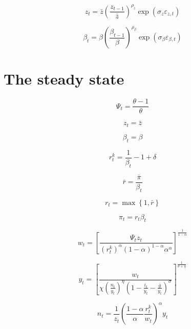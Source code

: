 \documentclass{article}
\begin{document}
\begin{equation}
z_{t}=\bar{z}\left( \frac{z_{t-1}}{\bar{z}}\right) ^{\rho _{z}}\exp \left(
\sigma _{z}\varepsilon _{z,t}\right)
\end{equation}

\begin{equation}
\beta _{t}=\beta \left( \frac{\beta _{t-1}}{\beta }\right) ^{\rho _{\beta
}}\exp \left( \sigma _{\beta }\varepsilon _{\beta ,t}\right)
\end{equation}

\section{The steady state}

\begin{equation}
\Psi _{t}=\frac{\theta -1}{\theta }
\end{equation}

\begin{equation}
z_{t}=\bar{z}
\end{equation}

\begin{equation}
\beta _{t}=\beta 
\end{equation}

\begin{equation}
r_{t}^{k}=\frac{1}{\beta _{t}}-1+\delta 
\end{equation}

\[
\bar{r}=\frac{\bar{\pi}}{\beta _{t}}
\]

\begin{equation}
r_{t}=\max \left\{ 1,\bar{r}\right\} 
\end{equation}

\begin{equation}
\pi _{t}=r_{t}\beta _{t}
\end{equation}

\begin{equation}
w_{t}=\left[ \frac{\Psi _{t}z_{t}}{\left( r_{t}^{k}\right) ^{\alpha }\left(
1-\alpha \right) ^{1-\alpha }\alpha ^{\alpha }}\right] ^{\frac{1}{1-\alpha }}
\end{equation}

\begin{equation}
y_{t}=\left[ \frac{w_{t}}{\chi \left( \frac{n_{t}}{y_{t}}\right) ^{\eta
}\left( 1-\frac{i_{t}}{y_{t}}-\frac{\bar{g}}{y_{t}}\right) ^{\sigma }}\right]
^{\frac{1}{\sigma +\eta }}
\end{equation}

\begin{equation}
n_{t}=\frac{1}{z_{t}}\left( \frac{1-\alpha }{\alpha }\frac{r_{t}^{k}}{w_{t}}%
\right) ^{\alpha }y_{t}
\end{equation}
\end{document}
